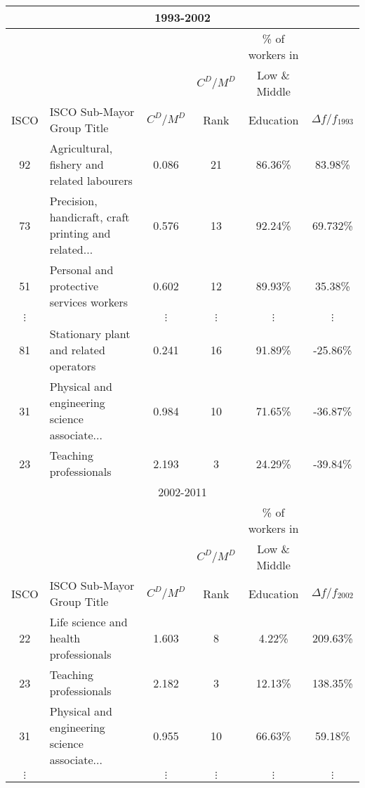 \begin{sideways}
  \begin{threeparttable}
     \begin{tabular}{clcccc}
      \toprule
      \midrule

        \multicolumn{6}{c}{1993-2002}\\
        \hline
         &  &  &  & \% of workers in & \\
         & 						& 	       & $C^D/M^D$    & Low \& Middle    & \\
        ISCO & ISCO Sub-Mayor Group Title & $C^D/M^D$ & Rank & Education & $\Delta f/f_{1993}$\\

        \hline
  92 & Agricultural, fishery and related labourers & 0.086 & 21 & 86.36\% & 83.98\% \\
  73 & Precision, handicraft, craft printing and related... & 0.576 & 13 & 92.24\% & 69.732\% \\
  51 & Personal and protective services workers & 0.602 & 12 & 89.93\% & 35.38\% \\

        $\vdots$ &  & $\vdots$ & $\vdots$ & $\vdots$ & $\vdots$ \\

	81 & Stationary plant and related operators & 0.241 & 16 & 91.89\% & -25.86\% \\
	31 & Physical and engineering science associate... & 0.984 & 10 & 71.65\% & -36.87\% \\
	23 & Teaching professionals & 2.193 & 3 & 24.29\% & -39.84\% \\

        \hline
        \hline
        \multicolumn{6}{c}{2002-2011}\\
        \hline
         &  &  &  & \% of workers in & \\
         &            &          & $C^D/M^D$    & Low \& Middle    & \\
        ISCO & ISCO Sub-Mayor Group Title & $C^D/M^D$ & Rank & Education & $\Delta f/f_{2002}$\\
        \hline
  22 & Life science and health professionals & 1.603 & 8 & 4.22\% & 209.63\% \\
	23 & Teaching professionals & 2.182 & 3 & 12.13\% & 138.35\% \\
	31 & Physical and engineering science associate... & 0.955 & 10 & 66.63\% & 59.18\% \\

        $\vdots$ &  & $\vdots$ & $\vdots$ & $\vdots$ & $\vdots$ \\


\end{tabular}
\end{threeparttable}
\end{sideways}
